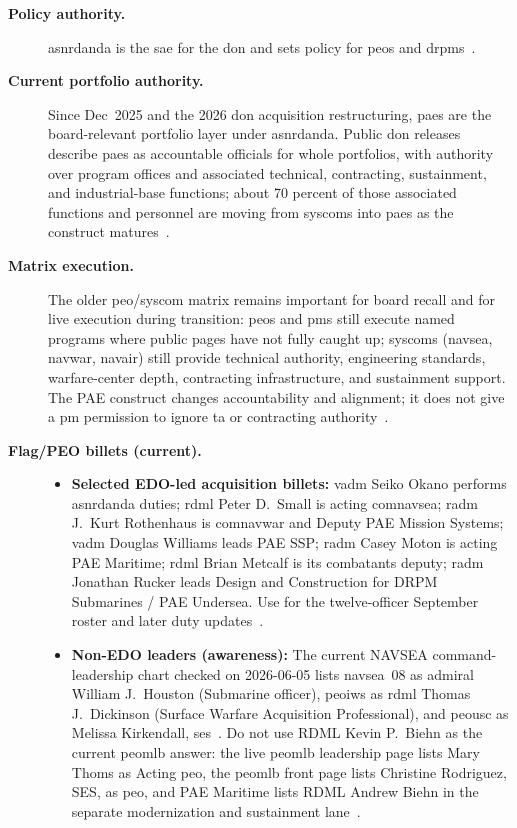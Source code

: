 \documentclass[../main.tex]{subfiles}
\begin{document}
\begin{description}
  \item[\textbf{Policy authority.}] \ac{asnrdanda} is the \ac{sae} for the \ac{don} and sets policy for \acp{peo} and \acp{drpm}~\autocite{SECNAV5400-15D,SECNAV5000-2G}.
  \item[\textbf{Current portfolio authority.}] Since Dec~2025 and the 2026 \ac{don} acquisition restructuring, \acp{pae} are the board-relevant portfolio layer under \ac{asnrdanda}. Public \ac{don} releases describe \acp{pae} as accountable officials for whole portfolios, with authority over program offices and associated technical, contracting, sustainment, and industrial-base functions; about 70 percent of those associated functions and personnel are moving from \acp{syscom} into \acp{pae} as the construct matures~\autocite{DON-PAE-Establishment-2026,DON-PAE-Expansion-May2026}.
  \item[\textbf{Matrix execution.}] The older \ac{peo}/\ac{syscom} matrix remains important for board recall and for live execution during transition: \acp{peo} and \acp{pm} still execute named programs where public pages have not fully caught up; \acp{syscom} (\ac{navsea}, \ac{navwar}, \ac{navair}) still provide technical authority, engineering standards, warfare-center depth, contracting infrastructure, and sustainment support. The PAE construct changes accountability and alignment; it does not give a \ac{pm} permission to ignore \ac{ta} or contracting authority~\autocite{SECNAV5400-15D,DON-PAE-Establishment-2026,DON-PAE-Expansion-May2026}.
  \item[\textbf{Flag/PEO billets (current).}]
        \begin{itemize}
            \item[] \textbf{Selected EDO-led acquisition billets:} \ac{vadm} Seiko Okano performs \ac{asnrdanda} duties; \ac{rdml} Peter D.\ Small is acting \ac{comnavsea}; \ac{radm} J.\ Kurt Rothenhaus is \ac{comnavwar} and Deputy PAE Mission Systems; \ac{vadm} Douglas Williams leads PAE SSP; \ac{radm} Casey Moton is acting PAE Maritime; \ac{rdml} Brian Metcalf is its combatants deputy; \ac{radm} Jonathan Rucker leads Design and Construction for DRPM Submarines / PAE Undersea. Use \App{\ref{app:edo-flags}} for the twelve-officer September roster and later duty updates~\autocite{edo-2-1-1-command-structures-2025,DVIDS-Small-NAVSEA-Aug2026,DVIDS-SSP-Handoff-Jun2026,PAE-Maritime-Moton-Sep2026,ExecutiveGov-ASNRDA-Sep2026}.
            \item[] \textbf{Non-EDO leaders (awareness):} The current NAVSEA command-leadership chart checked on 2026-06-05 lists \ac{navsea}~08 as \ac{admiral} William J.\ Houston (Submarine officer), \ac{peoiws} as \ac{rdml} Thomas J.\ Dickinson (Surface Warfare Acquisition Professional), and \ac{peousc} as Melissa Kirkendall, \ac{ses}~\autocite{navsea-command-leadership-2026}. Do not use RDML Kevin P.\ Biehn as the current \ac{peomlb} answer: the live \ac{peomlb} leadership page lists Mary Thoms as Acting \ac{peo}, the \ac{peomlb} front page lists Christine Rodriguez, SES, as \ac{peo}, and PAE Maritime lists RDML Andrew Biehn in the separate modernization and sustainment lane~\autocite{PEOMLB-leadership-2026,PEOMLB-home-2026,PAE-Maritime-Homepage-2026}.

\end{itemize}
\end{description}
\end{document}
